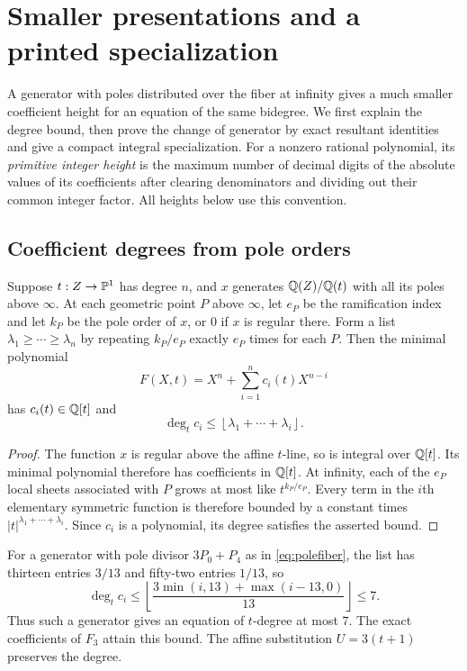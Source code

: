 \section{Smaller presentations and a printed specialization}\label{sec:smaller}

A generator with poles distributed over the fiber at infinity gives a
much smaller coefficient height for an equation of the same bidegree.
We first explain the degree bound, then prove the change of generator by
exact resultant identities and give a compact integral specialization.
For a nonzero rational polynomial, its \emph{primitive integer height}
is the maximum number of decimal digits of the absolute values of its
coefficients after clearing denominators and dividing out their common
integer factor. All heights below use this convention.

\subsection{Coefficient degrees from pole orders}
\begin{lemma}\label{lem:polebound}
Suppose $t:Z\to\mathbb{P}^1$ has degree $n$, and $x$ generates $\mathbb{Q}(Z)/\mathbb{Q}(t)$
with all its poles above $\infty$. At each geometric point $P$ above
$\infty$, let $e_P$ be the ramification index and let $k_P$ be the pole
order of $x$, or $0$ if $x$ is regular there. Form a list
$\lambda_1\geq\cdots\geq\lambda_n$ by repeating $k_P/e_P$ exactly $e_P$
times for each $P$. Then the minimal polynomial
\[
 F(X,t)=X^n+\sum_{i=1}^{n}c_i(t)X^{n-i}
\]
has $c_i(t)\in\mathbb{Q}[t]$ and
\[
 \deg_t c_i\leq\left\lfloor\lambda_1+\cdots+\lambda_i\right\rfloor.
\]
\end{lemma}
\begin{proof}
The function $x$ is regular above the affine $t$-line, so is integral over
$\mathbb{Q}[t]$. Its minimal polynomial therefore has coefficients in $\mathbb{Q}[t]$.
At infinity, each of the $e_P$ local sheets associated with $P$ grows at most like
$t^{k_P/e_P}$. Every term in the $i$th elementary symmetric function is
therefore bounded by a constant times $|t|^{\lambda_1+\cdots+\lambda_i}$.
Since $c_i$ is a polynomial, its degree satisfies the asserted bound.
\end{proof}

For a generator with pole divisor $3P_0+P_4$ as in
\eqref{eq:polefiber}, the list has thirteen entries $3/13$ and fifty-two entries
$1/13$, so
\[
 \deg_t c_i\leq
 \left\lfloor\frac{3\min(i,13)+\max(i-13,0)}{13}\right\rfloor\leq7.
\]
Thus such a generator gives an equation of $t$-degree at most $7$.
The exact coefficients of $F_3$ attain this bound. The affine substitution
$U=3(t+1)$ preserves the degree.

